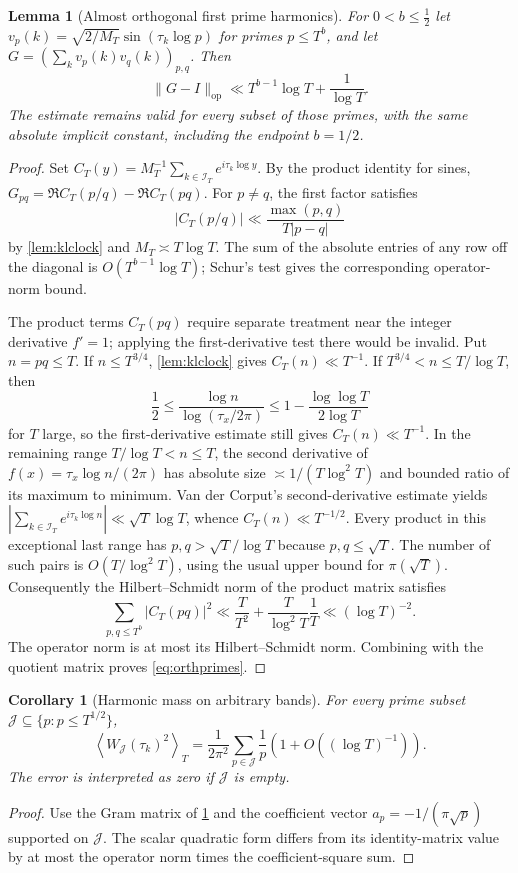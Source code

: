 \documentclass[11pt,reqno]{amsart}
\numberwithin{equation}{section}
\newtheorem{lemma}[theorem]{Lemma}
\newtheorem{corollary}[theorem]{Corollary}
\newcommand{\av}[1]{\left\langle #1\right\rangle_T}
\begin{document}
\begin{lemma}[Almost orthogonal first prime harmonics]\label{lem:orthprimes}
For $0<b\le\tfrac12$ let
$v_p(k)=\sqrt{2/M_T}\sin(\tau_k\log p)$ for primes $p\le T^b$,
and let $G=(\sum_kv_p(k)v_q(k))_{p,q}$.  Then
\begin{equation}\label{eq:orthprimes}
\|G-I\|_{\mathrm{op}}
 \ll T^{b-1}\log T+\frac1{\log T}.
\end{equation}
The estimate remains valid for every subset of those primes, with the
same absolute implicit constant, including the endpoint $b=1/2$.
\end{lemma}
\begin{proof}
Set $C_T(y)=M_T^{-1}\sum_{k\in\mathcal I_T}e^{i\tau_k\log y}$.
By the product identity for sines,
$G_{pq}=\Re C_T(p/q)-\Re C_T(pq)$.  For $p\ne q$, the first
factor satisfies
\[
|C_T(p/q)|\ll\frac{\max(p,q)}{T|p-q|}
\]
by \cref{lem:klclock} and $M_T\asymp T\log T$.
The sum of the absolute entries of any row off the diagonal is
$O(T^{b-1}\log T)$; Schur's test gives the corresponding
operator-norm bound.

The product terms $C_T(pq)$ require separate treatment near the
integer derivative $f'=1$; applying the first-derivative test there
would be invalid.  Put $n=pq\le T$.  If $n\le T^{3/4}$,
\cref{lem:klclock} gives $C_T(n)\ll T^{-1}$.  If
$T^{3/4}<n\le T/\log T$, then
\[
\frac12\le\frac{\log n}{\log(\tau_x/2\pi)}
 \le 1-\frac{\log\log T}{2\log T}
\]
for $T$ large, so the first-derivative estimate still gives
$C_T(n)\ll T^{-1}$.  In the remaining range
$T/\log T<n\le T$, the second derivative of
$f(x)=\tau_x\log n/(2\pi)$ has absolute size
$\asymp1/(T\log^2T)$ and bounded ratio of its maximum to minimum.
Van der Corput's second-derivative estimate yields
$|\sum_{k\in\mathcal I_T}e^{i\tau_k\log n}|
\ll\sqrt T\log T$, whence $C_T(n)\ll T^{-1/2}$.
Every product in this exceptional last range has
$p,q>\sqrt T/\log T$ because $p,q\le\sqrt T$.
The number of such pairs is $O(T/\log^2T)$, using the usual
upper bound for $\pi(\sqrt T)$.  Consequently the Hilbert--Schmidt
norm of the product matrix satisfies
\[
\sum_{p,q\le T^b}|C_T(pq)|^2
 \ll \frac{T}{T^2}+\frac{T}{\log^2T}\frac1T
 \ll(\log T)^{-2}.
\]
The operator norm is at most its Hilbert--Schmidt norm.  Combining
with the quotient matrix proves \eqref{eq:orthprimes}.
\end{proof}

\begin{corollary}[Harmonic mass on arbitrary bands]
\label{cor:massbands}
For every prime subset $\mathcal J\subseteq\{p:p\le T^{1/2}\}$,
\begin{equation}\label{eq:massbands}
\av{W_{\mathcal J}(\tau_k)^2}
=\frac1{2\pi^2}\sum_{p\in\mathcal J}\frac1p
 \left(1+O((\log T)^{-1})\right).
\end{equation}
The error is interpreted as zero if $\mathcal J$ is empty.
\end{corollary}
\begin{proof}
Use the Gram matrix of \cref{lem:orthprimes} and the coefficient
vector $a_p=-1/(\pi\sqrt p)$ supported on $\mathcal J$.
The scalar quadratic form differs from its identity-matrix value by
at most the operator norm times the coefficient-square sum.
\end{proof}
\end{document}
